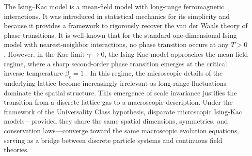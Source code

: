\documentclass{article}
\begin{document}
The Ising–Kac model is a mean-field model with long-range ferromagnetic interactions. 
It was introduced in statistical mechanics for its simplicity and because it provides a framework to rigorously recover the van der Waals theory \cite{kac1963van} of phase transitions.
It is well-known that for the standard one-dimensional Ising model with nearest-neighbor interactions, no phase transition occurs at any $T > 0$ \cite{Ising25}. However, in the Kac-limit $\gamma \to 0$, the Ising-Kac model approaches the mean-field regime, where a sharp second-order phase transition emerges at the critical inverse temperature $\beta_c = 1$ \cite{kac1963van, LP1966}.
In this regime, the microscopic details of the underlying lattice become increasingly irrelevant as long-range fluctuations dominate the spatial structure.
This emergence of scale invariance justifies the transition from a discrete lattice gas to a macroscopic description. 
Under the framework of the Universality Class hypothesis, disparate microscopic Ising-Kac models—provided they share the same spatial dimensions, symmetries, and conservation laws—converge toward the same macroscopic evolution equations, serving as a bridge between discrete particle systems and continuous field theories. 
\end{document}

